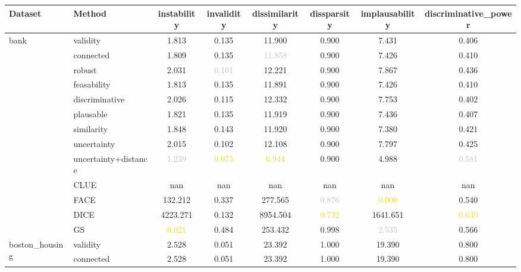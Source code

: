 \begin{table}[ht]
\centering
\begin{tabular}{l l c c c c c c}
\hline
Dataset & Method & instability & invalidity & dissimilarity & dissparsity & implausability & discriminative_power \\
\hline
\multirow{13}{*}{bank} & validity & 1.813 & 0.135 & 11.900 & \textcolor{bronze}{0.900} & 7.431 & 0.406 \\
 & connected & \textcolor{bronze}{1.809} & 0.135 & \textcolor{silver}{11.858} & \textcolor{bronze}{0.900} & 7.426 & 0.410 \\
 & robust & 2.031 & \textcolor{silver}{0.101} & 12.221 & \textcolor{bronze}{0.900} & 7.867 & 0.436 \\
 & feasability & 1.813 & 0.135 & \textcolor{bronze}{11.891} & \textcolor{bronze}{0.900} & 7.426 & 0.410 \\
 & discriminative & 2.026 & 0.115 & 12.332 & \textcolor{bronze}{0.900} & 7.753 & 0.402 \\
 & plausable & 1.821 & 0.135 & 11.919 & \textcolor{bronze}{0.900} & 7.436 & 0.407 \\
 & similarity & 1.848 & 0.143 & 11.920 & \textcolor{bronze}{0.900} & 7.380 & 0.421 \\
 & uncertainty & 2.015 & \textcolor{bronze}{0.102} & 12.108 & \textcolor{bronze}{0.900} & 7.797 & 0.425 \\
 & uncertainty+distance & \textcolor{silver}{1.239} & \textcolor{gold}{0.075} & \textcolor{gold}{6.944} & \textcolor{bronze}{0.900} & \textcolor{bronze}{4.988} & \textcolor{silver}{0.581} \\
 & CLUE & nan & nan & nan & nan & nan & nan \\
 & FACE & 132.212 & 0.337 & 277.565 & \textcolor{silver}{0.876} & \textcolor{gold}{0.000} & 0.540 \\
 & DICE & 4223.271 & 0.132 & 8954.504 & \textcolor{gold}{0.732} & 1641.651 & \textcolor{gold}{0.639} \\
 & GS & \textcolor{gold}{0.921} & 0.484 & 253.432 & 0.998 & \textcolor{silver}{2.535} & \textcolor{bronze}{0.566} \\
\hline
\multirow{13}{*}{boston_housing} & validity & 2.528 & 0.051 & 23.392 & \textcolor{bronze}{1.000} & 19.390 & \textcolor{bronze}{0.800} \\
 & connected & 2.528 & 0.051 & 23.392 & \textcolor{bronze}{1.000} & 19.390 & \textcolor{bronze}{0.800} \\

\end{tabular}
\end{table}
